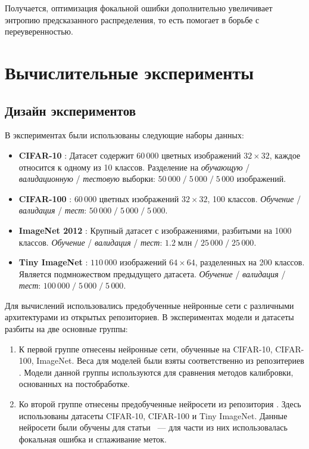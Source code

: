 \documentclass[12pt]{article}
\begin{document}
Получается, оптимизация фокальной ошибки дополнительно увеличивает энтропию предсказанного распределения, то есть помогает в борьбе с переуверенностью.

\section{Вычислительные эксперименты}\label{sec:experiments}

\subsection{Дизайн экспериментов}

В экспериментах были использованы следующие наборы данных:
\begin{itemize}
    \item \textbf{CIFAR-10} \cite{cifar}: Датасет содержит $60\,000$ цветных изображений $32\times 32$, каждое относится к одному из 10 классов. Разделение на \emph{обучающую} / \emph{валидационную} / \emph{тестовую} выборки: $50\,000\;/\;5\,000\;/\;5\,000$ изображений.
    \item \textbf{CIFAR-100} \cite{cifar}: $60\,000$ цветных изображений $32\times 32$, 100 классов. \emph{Обучение} / \emph{валидация} / \emph{тест}: $50\,000\;/\;5\,000\;/\;5\,000$.
    \item \textbf{ImageNet 2012} \cite{imagenet}: Крупный датасет с изображениями, разбитыми на 1000 классов. \emph{Обучение} / \emph{валидация} / \emph{тест}: $1.2\;\text{млн}\;/\;25\,000\;/\;25\,000$.
    \item \textbf{Tiny ImageNet} \cite{imagenet}: $110\,000$ изображений $64\times 64$, разделенных на 200 классов. Является подмножеством предыдущего датасета. \emph{Обучение} / \emph{валидация} / \emph{тест}: $100\,000\;/\;5\,000\;/\;5\,000$.
\end{itemize}

Для вычислений использовались предобученные нейронные сети с различными архитектурами из открытых репозиториев. В экспериментах модели и датасеты разбиты на две основные группы:

\begin{enumerate}
    \item К первой группе отнесены нейронные сети, обученные на CIFAR-10, CIFAR-100, ImageNet. Веса для моделей были взяты соответственно из репозитериев \cite{pretrained_cifar10, pretrained_cifar100, pretrained_imagenet}. Модели данной группы используются для сравнения методов калибровки, основанных на постобработке.
    \item Ко второй группе отнесены предобученные нейросети из репозитория \cite{focal_github}. Здесь использованы датасеты CIFAR-10, CIFAR-100 и Tiny ImageNet. Данные нейросети были обучены для статьи \cite{focal_calib}~--- для части из них использовалась фокальная ошибка и сглаживание меток.
\end{enumerate}
\end{document}
